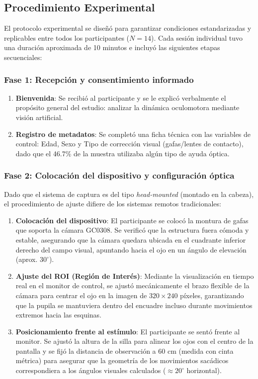 \subsection{Procedimiento Experimental}

El protocolo experimental se diseñó para garantizar condiciones estandarizadas y replicables entre todos los participantes ($N=14$).
Cada sesión individual tuvo una duración aproximada de 10 minutos e incluyó las siguientes etapas secuenciales:

\subsubsection{Fase 1: Recepción y consentimiento informado}

\begin{enumerate}
	\item \textbf{Bienvenida}: Se recibió al participante y se le explicó verbalmente el propósito general del estudio: analizar la dinámica oculomotora mediante visión artificial.
	\item \textbf{Registro de metadatos}: Se completó una ficha técnica con las variables de control: Edad, Sexo y Tipo de corrección visual (gafas/lentes de contacto), dado que el 46.7\% de la muestra utilizaba algún tipo de ayuda óptica.
\end{enumerate}

\subsubsection{Fase 2: Colocación del dispositivo y configuración óptica}

Dado que el sistema de captura es del tipo \textit{head-mounted} (montado en la cabeza), el procedimiento de ajuste difiere de los sistemas remotos tradicionales:

\begin{enumerate}
	\item \textbf{Colocación del dispositivo}: El participante se colocó la montura de gafas que soporta la cámara GC0308.
	Se verificó que la estructura fuera cómoda y estable, asegurando que la cámara quedara ubicada en el cuadrante inferior derecho del campo visual, apuntando hacia el ojo en un ángulo de elevación (aprox. $30^\circ$).
	\item \textbf{Ajuste del ROI (Región de Interés)}: Mediante la visualización en tiempo real en el monitor de control, se ajustó mecánicamente el brazo flexible de la cámara para centrar el ojo en la imagen de $320 \times 240$ píxeles, garantizando que la pupila se mantuviera dentro del encuadre incluso durante movimientos extremos hacia las esquinas.
	\item \textbf{Posicionamiento frente al estímulo}: El participante se sentó frente al monitor.
	Se ajustó la altura de la silla para alinear los ojos con el centro de la pantalla y se fijó la distancia de observación a 60 cm (medida con cinta métrica) para asegurar que la geometría de los movimientos sacádicos correspondiera a los ángulos visuales calculados ($\approx 20^\circ$ horizontal).
\end{enumerate}


